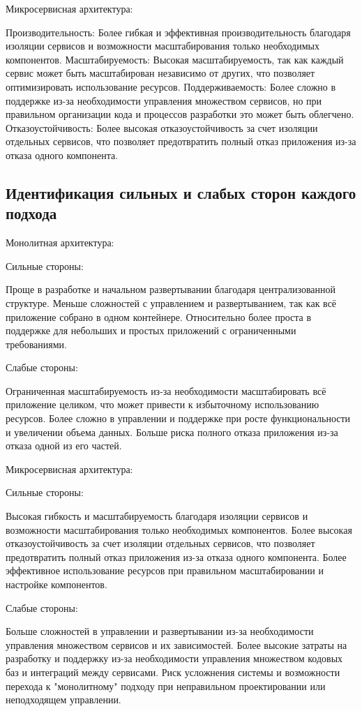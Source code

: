     Микросервисная архитектура:
    
        Производительность: Более гибкая и эффективная производительность благодаря изоляции сервисов и возможности масштабирования только необходимых компонентов.
        Масштабируемость: Высокая масштабируемость, так как каждый сервис может быть масштабирован независимо от других, что позволяет оптимизировать использование ресурсов.
        Поддерживаемость: Более сложно в поддержке из-за необходимости управления множеством сервисов, но при правильном организации кода и процессов разработки это может быть облегчено.
        Отказоустойчивость: Более высокая отказоустойчивость за счет изоляции отдельных сервисов, что позволяет предотвратить полный отказ приложения из-за отказа одного компонента.

\subsection{Идентификация сильных и слабых сторон каждого подхода}
    Монолитная архитектура:

    Сильные стороны:
    
        Проще в разработке и начальном развертывании благодаря централизованной структуре.
        Меньше сложностей с управлением и развертыванием, так как всё приложение собрано в одном контейнере.
        Относительно более проста в поддержке для небольших и простых приложений с ограниченными требованиями.
    
    Слабые стороны:
    
        Ограниченная масштабируемость из-за необходимости масштабировать всё приложение целиком, что может привести к избыточному использованию ресурсов.
        Более сложно в управлении и поддержке при росте функциональности и увеличении объема данных.
        Больше риска полного отказа приложения из-за отказа одной из его частей.
    
    Микросервисная архитектура:
    
    Сильные стороны:
    
        Высокая гибкость и масштабируемость благодаря изоляции сервисов и возможности масштабирования только необходимых компонентов.
        Более высокая отказоустойчивость за счет изоляции отдельных сервисов, что позволяет предотвратить полный отказ приложения из-за отказа одного компонента.
        Более эффективное использование ресурсов при правильном масштабировании и настройке компонентов.
    
    Слабые стороны:
    
        Больше сложностей в управлении и развертывании из-за необходимости управления множеством сервисов и их зависимостей.
        Более высокие затраты на разработку и поддержку из-за необходимости управления множеством кодовых баз и интеграций между сервисами.
        Риск усложнения системы и возможности перехода к "монолитному" подходу при неправильном проектировании или неподходящем управлении.
        
\clearpage
